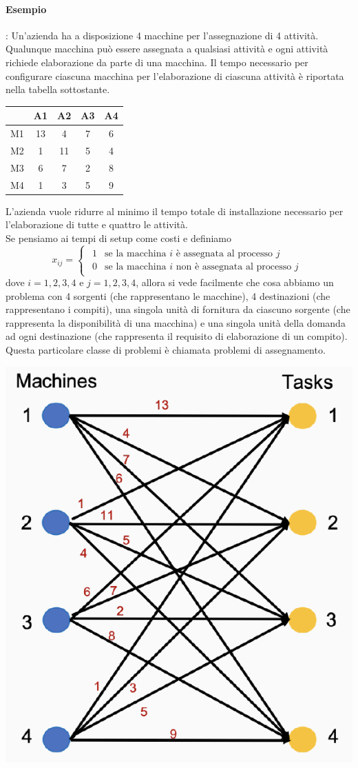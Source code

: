 \documentclass[12pt,a4paper]{article}
\begin{document}
\paragraph{Esempio}: Un'azienda ha a disposizione 4 macchine per l'assegnazione di 4 attività. Qualunque macchina può essere assegnata a qualsiasi attività e ogni attività richiede
elaborazione da parte di una macchina. Il tempo necessario per configurare ciascuna
macchina per l'elaborazione di ciascuna attività è riportata nella tabella sottostante.
\begin{center}
\begin{tabular}{ccccc}
& A1 & A2 & A3 & A4 \\ \hline
M1 & 13 & 4 & 7 & 6 \\
M2 & 1 & 11 & 5 & 4 \\
M3 & 6 & 7 & 2 & 8 \\
M4 & 1 & 3 & 5 & 9 \\ \hline
\end{tabular}
\end{center}
L'azienda vuole ridurre al minimo il tempo totale di installazione necessario per l'elaborazione di tutte e quattro le attività.\\
Se pensiamo ai tempi di setup come costi e definiamo
\begin{equation*}
x_{ij} = \begin{cases}
\begin{array}{ll}
1 & \text{se la macchina $i$ è assegnata al processo $j$}\\
0 & \text{se la macchina $i$ non è assegnata al processo $j$}
\end{array}
\end{cases}
\end{equation*}
dove $i = 1, 2, 3, 4$ e $j = 1, 2, 3, 4$, allora si vede facilmente che cosa abbiamo un problema con 4 sorgenti (che rappresentano le macchine), 4 destinazioni (che rappresentano i compiti), una singola unità di fornitura da ciascuno sorgente (che rappresenta la disponibilità di una macchina) e una singola unità della domanda ad ogni destinazione (che rappresenta il requisito di elaborazione di un compito). Questa particolare classe di problemi è chiamata problemi di assegnamento.
\begin{center}
\includegraphics[width=0.4\columnwidth]{img/es_ap.png}
\end{center}
\end{document}
